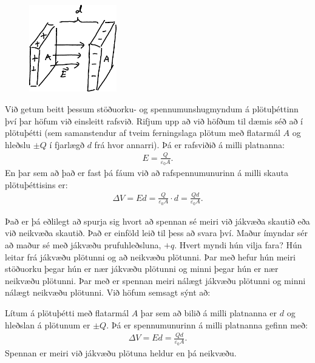 \begin{minipage}{\linewidth}
\begin{figure}
\vspace{-0.95cm}
\includegraphics[width=1.5in]{figures/eda.pdf}
\end{figure}

Við getum beitt þessum stöðuorku- og spennumunshugmyndum á plötuþéttinn því þar höfum við einsleitt rafsvið. Rifjum upp að við höfðum til dæmis séð að í plötuþétti (sem samanstendur af tveim ferningslaga plötum með flatarmál $A$ og hleðslu $\pm Q$ í fjarlægð $d$ frá hvor annarri). Þá er rafsviðið á milli platnanna:
\begin{align*}
    E = \frac{Q}{\varepsilon_0 A}.
\end{align*}
En þar sem að það er fast þá fáum við að rafspennumunurinn á milli skauta plötuþéttisins er:
\begin{align*}
    \Delta V = Ed = \frac{Q}{\varepsilon_0 A } \cdot d = \frac{Q d}{\varepsilon_0 A}.
\end{align*}

Það er þá eðlilegt að spurja sig hvort að spennan sé meiri við jákvæða skautið eða við neikvæða skautið. Það er einföld leið til þess að svara því. Maður ímyndar sér að maður sé með jákvæðu prufuhleðsluna, $+q$. Hvert myndi hún vilja fara? Hún leitar frá jákvæðu plötunni og að neikvæðu plötunni. Þar með hefur hún meiri stöðuorku þegar hún er nær jákvæðu plötunni og minni þegar hún er nær neikvæðu plötunni. Þar með er spennan meiri nálægt jákvæðu plötunni og minni nálægt neikvæðu plötunni. Við höfum semsagt sýnt að:
\end{minipage}
\begin{tcolorbox}
\begin{theorem}
Lítum á plötuþétti með flatarmál $A$ þar sem að bilið á milli platnanna er $d$ og hleðslan á plötunum er $\pm Q$. Þá er spennumunurinn á milli platnanna gefinn með:
\begin{align*}
    \Delta V = Ed = \frac{Qd}{\varepsilon_0 A}.
\end{align*}
Spennan er meiri við jákvæðu plötuna heldur en þá neikvæðu.
\end{theorem}
\end{tcolorbox}

